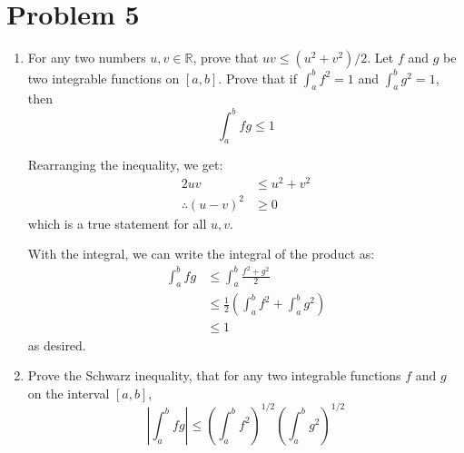 \documentclass[10pt]{article}
\begin{document}
	\pagebreak
	\section*{Problem 5}

	\begin{enumerate}[label=\alph*)]
		\item For any two numbers $u, v\in \mathbb R$, prove that $uv \le (u^2 + v^2)/2$. Let $f$ and $g$ be two
			integrable functions on $[a, b]$. Prove that if $\int_a^b f^2 = 1$ and $\int_a^b g^2 = 1$, then \[
			\int_a^b fg \le 1
			\] 

			\begin{solution}
				Rearranging the inequality, we get: 
				\begin{align*}
					2uv &\le u^2 + v^2\\
					\therefore (u-v)^2 &\ge 0
				\end{align*}
				which is a true statement for all $u, v$.

				With the integral, we can write the integral of the product as: 
				\begin{align*}
					\int_a^b fg &\le \int_a^b \frac{f^2 + g^2}{2}\\
					&\le \frac{1}{2}\left( \int_a^b f^2 + \int_a^b g^2\right)\\
					& \le 1
				\end{align*}
				as desired. 
			\end{solution}
		\item Prove the Schwarz inequality, that for any two integrable functions $f$ and $g$ on the interval
			$[a, b]$, 
			\[
				\left| \int_a^b fg\right| \le \left( \int_a^b f^2\right)^{1/2} \left( \int_a^b g^2 \right)^{1/2}
			\] 

			\begin{solution}
				
			\end{solution}
	\end{enumerate}
\end{document}
